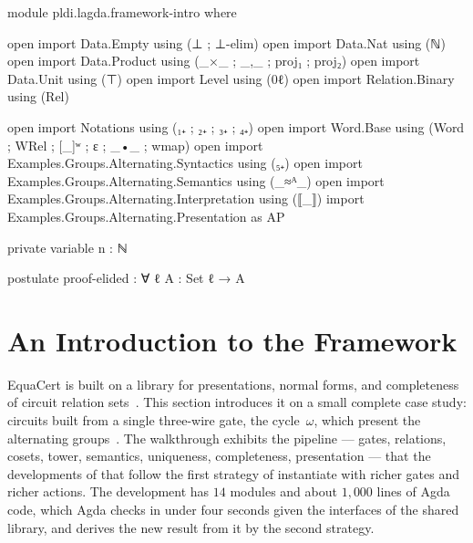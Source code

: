 \begin{code}[hide]
module pldi.lagda.framework-intro where

open import Data.Empty using (⊥ ; ⊥-elim)
open import Data.Nat using (ℕ)
open import Data.Product using (_×_ ; _,_ ; proj₁ ; proj₂)
open import Data.Unit using (⊤)
open import Level using (0ℓ)
open import Relation.Binary using (Rel)

open import Notations using (₁₊ ; ₂₊ ; ₃₊ ; ₄₊)
open import Word.Base using (Word ; WRel ; [_]ʷ ; ε ; _•_ ; wmap)
open import Examples.Groups.Alternating.Syntactics using (₅₊)
open import Examples.Groups.Alternating.Semantics using (_≈ᴬ_)
open import Examples.Groups.Alternating.Interpretation using (⟦_⟧)
import Examples.Groups.Alternating.Presentation as AP

private variable
  n : ℕ

postulate
  proof-elided : ∀ {ℓ} {A : Set ℓ} → A
\end{code}
\section{An Introduction to the Framework}\label{sec:case-study}

EquaCert is built on a library for presentations, normal forms, and completeness of circuit relation sets~\cite{bian2027popl}. This section introduces it on a small complete case study: circuits built from a single three-wire gate, the cycle~$\omega$, which present the alternating groups~\cite[\S2.4]{lafont2003boolean}. The walkthrough exhibits the pipeline --- gates, relations, cosets, tower, semantics, uniqueness, completeness, presentation --- that the developments of  that follow the first strategy of  instantiate with richer gates and richer actions. The development has $14$ modules and about $1{,}000$ lines of Agda code, which Agda checks in under four seconds given the interfaces of the shared library, and  derives the new result from it by the second strategy.

